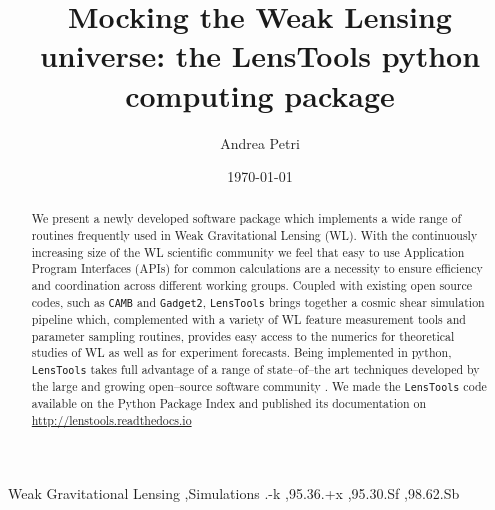 \documentclass[5p]{elsarticle}
\newcommand{\ttt}[1]{\texttt{#1}}
\newcommand{\LT}{\texttt{LensTools} }
\begin{document}
\title{Mocking the Weak Lensing universe: the LensTools python computing package}

\author[cu,bnl]{Andrea Petri}

\address[cu]{Department of Physics, Columbia University, New York, NY 10027, USA}
\address[bnl]{Physics Department, Brookhaven National Laboratory, Upton, NY 11973, USA}

\date{\today}

\label{firstpage}

\begin{abstract}
We present a newly developed software package which implements a wide range of routines frequently used in Weak Gravitational Lensing (WL). With the continuously increasing size of the WL scientific community we feel that easy to use Application Program Interfaces (APIs) for common calculations are a necessity to ensure efficiency and coordination across different working groups. Coupled with existing open source codes, such as \ttt{CAMB}\citep{CAMB} and \ttt{Gadget2}\citep{Gadget2}, \LT brings together a cosmic shear simulation pipeline which, complemented with a variety of WL feature measurement tools and parameter sampling routines, provides easy access to the numerics for theoretical studies of WL as well as for experiment forecasts. Being implemented in {\sc python}\citep{python}, \LT takes full advantage of a range of state--of--the art techniques developed by the large and growing open--source software community \citep{scipy,pandas,astropy,scikit-learn,emcee}. We made the \LT code available on the Python Package Index and published its documentation on \url{http://lenstools.readthedocs.io}      
    
\end{abstract}

\begin{keyword}
Weak Gravitational Lensing \sep Simulations
.-k \sep 95.36.+x \sep 95.30.Sf \sep 98.62.Sb
\end{keyword}

\maketitle


\end{document}
